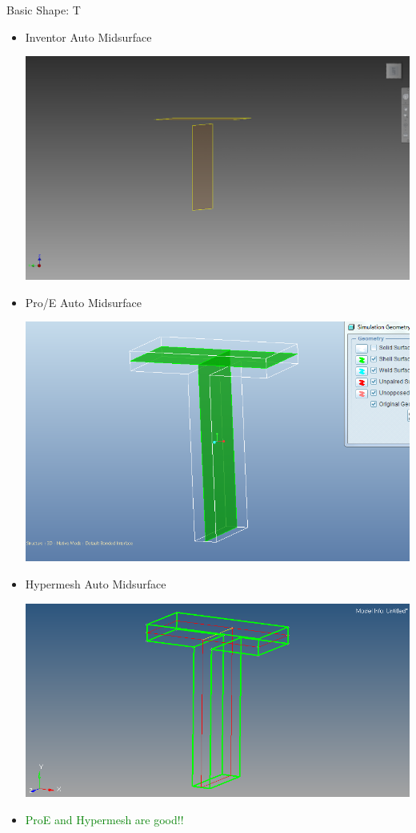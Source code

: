 \begin{frame}{Basic Shape: T}
\begin{itemize}[noitemsep,label=\textbullet,topsep=2pt,parsep=2pt,partopsep=2pt]

\item Inventor Auto Midsurface

\includegraphics[scale=0.09]{../Common/images/Inventor_T_Mids.png}

\item Pro/E Auto Midsurface

\includegraphics[scale=0.15]{../Common/images/ProeTautoPairs.png}

\item Hypermesh Auto Midsurface

\includegraphics[scale=0.18]{../Common/images/HypermeshTauto.png}

\item \textcolor{green}{ProE and Hypermesh are good!!}
\end{itemize}
\end{frame}
